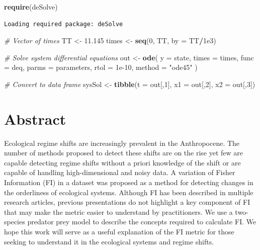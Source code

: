 \documentclass[12pt,twoside,openany]{reedthesis}
\newenvironment{Shaded}{\begin{snugshade}}{\end{snugshade}}
\newcommand{\KeywordTok}[1]{\textcolor[rgb]{0.13,0.29,0.53}{\textbf{#1}}}
\newcommand{\DataTypeTok}[1]{\textcolor[rgb]{0.13,0.29,0.53}{#1}}
\newcommand{\DecValTok}[1]{\textcolor[rgb]{0.00,0.00,0.81}{#1}}
\newcommand{\FloatTok}[1]{\textcolor[rgb]{0.00,0.00,0.81}{#1}}
\newcommand{\StringTok}[1]{\textcolor[rgb]{0.31,0.60,0.02}{#1}}
\newcommand{\CommentTok}[1]{\textcolor[rgb]{0.56,0.35,0.01}{\textit{#1}}}
\newcommand{\OperatorTok}[1]{\textcolor[rgb]{0.81,0.36,0.00}{\textbf{#1}}}
\newcommand{\NormalTok}[1]{#1}
\begin{document}
\begin{Shaded}
\begin{Highlighting}[]
\KeywordTok{require}\NormalTok{(deSolve)}
\end{Highlighting}
\end{Shaded}
\begin{verbatim}
Loading required package: deSolve
\end{verbatim}
\begin{Shaded}
\begin{Highlighting}[]
\CommentTok{# Vector of times}
\NormalTok{TT <-}\StringTok{  }\FloatTok{11.145}
\NormalTok{times <-}\StringTok{ }\KeywordTok{seq}\NormalTok{(}\DecValTok{0}\NormalTok{, TT, }\DataTypeTok{by =}\NormalTok{ TT}\OperatorTok{/}\FloatTok{1e3}\NormalTok{)}

\CommentTok{# Solve system differential equations}
\NormalTok{out <-}\StringTok{ }\KeywordTok{ode}\NormalTok{(}
  \DataTypeTok{y =}\NormalTok{ state,}
\NormalTok{  times}
\NormalTok{  =}\StringTok{ }\NormalTok{times,}
  \DataTypeTok{func =}\NormalTok{ deq,}
  \DataTypeTok{parms =}\NormalTok{ parameters,}
  \DataTypeTok{rtol =} \FloatTok{1e-10}\NormalTok{,}
  \DataTypeTok{method =} \StringTok{"ode45"}
\NormalTok{)}

\CommentTok{# Convert to data frame}
\NormalTok{sysSol <-}\StringTok{ }\KeywordTok{tibble}\NormalTok{(}\DataTypeTok{t =}\NormalTok{ out[,}\DecValTok{1}\NormalTok{], }\DataTypeTok{x1 =}\NormalTok{ out[,}\DecValTok{2}\NormalTok{], }\DataTypeTok{x2 =}\NormalTok{ out[,}\DecValTok{3}\NormalTok{]) }
\end{Highlighting}
\end{Shaded}
\section{Abstract}\label{abstract-1}

Ecological regime shifts are increasingly prevalent in the Anthropocene.
The number of methods proposed to detect these shifts are on the rise
yet few are capable detecting regime shifts without a priori knowledge
of the shift or are capable of handling high-dimensional and noisy data.
A variation of Fisher Information (FI) in a dataset was proposed as a
method for detecting changes in the orderliness of ecological systems.
Although FI has been described in multiple research articles, previous
presentations do not highlight a key component of FI that may make the
metric easier to understand by practitioners. We use a two-species
predator prey model to describe the concepts required to calculate FI.
We hope this work will serve as a useful explanation of the FI metric
for those seeking to understand it in the ecological systems and regime
shifts.
\end{document}
